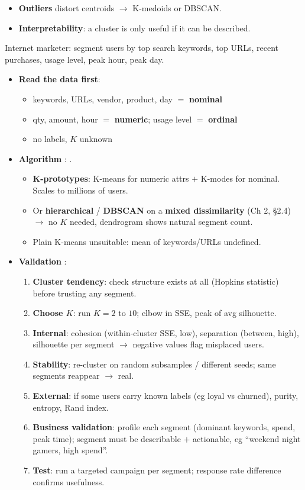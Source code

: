 {\begin{itemize}
  \item \textbf{Outliers} distort centroids $\rightarrow$ K-medoids or DBSCAN.
  \item \textbf{Interpretability}: a cluster is only useful if it can be described.
\end{itemize}
{\color{sub}\footnotesize Internet marketer: segment users by top search keywords, top URLs, recent purchases,
usage level, peak hour, peak day.}
\begin{itemize}
  \item \textbf{Read the data first}:
  \begin{itemize}
    \item keywords, URLs, vendor, product, day $=$ \textbf{nominal}
    \item qty, amount, hour $=$ \textbf{numeric}; usage level $=$ \textbf{ordinal}
    \item no labels, $K$ unknown
  \end{itemize}
  \item \textbf{Algorithm }: .
  \begin{itemize}
    \item \textbf{K-prototypes}: K-means for numeric attrs $+$ K-modes for nominal. Scales to millions of users.
    \item Or \textbf{hierarchical} / \textbf{DBSCAN} on a \textbf{mixed dissimilarity} (Ch 2, §2.4)
          $\rightarrow$ no $K$ needed, dendrogram shows natural segment count.
    \item Plain K-means unsuitable: mean of keywords/URLs undefined.
  \end{itemize}
  \item \textbf{Validation }:
  \begin{enumerate}
    \item \textbf{Cluster tendency}: check structure exists at all (Hopkins statistic) before trusting any segment.
    \item \textbf{Choose $K$}: run $K = 2$ to $10$; elbow in SSE, peak of avg silhouette.
    \item \textbf{Internal}: cohesion (within-cluster SSE, low), separation (between, high),
          silhouette per segment $\rightarrow$ negative values flag misplaced users.
    \item \textbf{Stability}: re-cluster on random subsamples / different seeds;
          same segments reappear $\rightarrow$ real.
    \item \textbf{External}: if some users carry known labels (eg loyal vs churned),
          purity, entropy, Rand index.
    \item \textbf{Business validation}: profile each segment (dominant keywords, spend, peak time);
          segment must be describable $+$ actionable, eg ``weekend night gamers, high spend''.
    \item \textbf{Test}: run a targeted campaign per segment; response rate difference confirms usefulness.
  \end{enumerate}
\end{itemize}}

